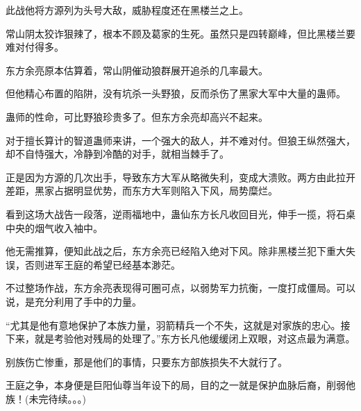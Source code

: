 \begin{this_body}
此战他将方源列为头号大敌，威胁程度还在黑楼兰之上。

常山阴太狡诈狠辣了，根本不顾及葛家的生死。虽然只是四转巅峰，但比黑楼兰要难对付得多。

东方余亮原本估算着，常山阴催动狼群展开追杀的几率最大。

但他精心布置的陷阱，没有坑杀一头野狼，反而杀伤了黑家大军中大量的蛊师。

蛊师的性命，可比野狼珍贵多了。但东方余亮却高兴不起来。

对于擅长算计的智道蛊师来讲，一个强大的敌人，并不难对付。但狼王纵然强大，却不自恃强大，冷静到冷酷的对手，就相当棘手了。

正是因为方源的几次出手，导致东方大军从略微失利，变成大溃败。两方由此拉开差距，黑家占据明显优势，而东方大军则陷入下风，局势糜烂。

看到这场大战告一段落，逆雨福地中，蛊仙东方长凡收回目光，伸手一揽，将石桌中央的烟气收入袖中。

他无需推算，便知此战之后，东方余亮已经陷入绝对下风。除非黑楼兰犯下重大失误，否则进军王庭的希望已经基本渺茫。

不过整场作战，东方余亮表现得可圈可点，以弱势军力抗衡，一度打成僵局。可以说，是充分利用了手中的力量。

“尤其是他有意地保护了本族力量，羽箭精兵一个不失，这就是对家族的忠心。接下来，就是考验他对残局的处理了。”东方长凡他缓缓闭上双眼，对这点最为满意。

别族伤亡惨重，那是他们的事情，只要东方部族损失不大就行了。

王庭之争，本身便是巨阳仙尊当年设下的局，目的之一就是保护血脉后裔，削弱他族！(未完待续。。。)

\end{this_body}

